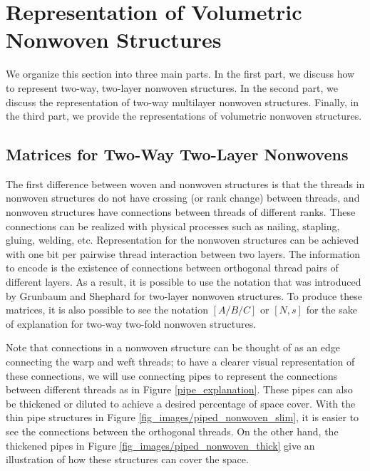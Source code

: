 \documentclass[times,twocolumn,final]{elsarticle}
\begin{document}
\section{Representation of Volumetric Nonwoven Structures}
\label{Sec_Representation_of_NWS}

We organize this section into three main parts. In the first part, we discuss how to represent two-way, two-layer nonwoven structures. In the second part, we discuss the representation of two-way multilayer nonwoven structures. Finally, in the third part, we provide the representations of volumetric nonwoven structures. 


\subsection{Matrices for Two-Way Two-Layer Nonwovens}

The first difference between woven and nonwoven structures is that the threads in nonwoven structures do not have crossing (or rank change) between threads, and nonwoven structures have connections between threads of different ranks. These connections can be realized with physical processes such as nailing, stapling, gluing, welding, etc. Representation for the nonwoven structures can be achieved with one bit per pairwise thread interaction between two layers. The information to encode is the existence of connections between orthogonal thread pairs of different layers. As a result, it is possible to use the notation that was introduced by Grunbaum and Shephard for two-layer nonwoven structures. To produce these matrices, it is also possible to see the notation $[A/B/C]$ or $[N,s]$ for the sake of explanation for two-way two-fold nonwoven structures.

Note that connections in a nonwoven structure can be thought of as an edge connecting the warp and weft threads; to have a clearer visual representation of these connections, we will use connecting pipes to represent the connections between different threads as in Figure \ref{pipe_explanation}. These pipes can also be thickened or diluted to achieve a desired percentage of space cover. With the thin pipe structures in Figure \ref{fig_images/piped_nonwoven_slim}, it is easier to see the connections between the orthogonal threads. On the other hand, the thickened pipes in Figure \ref{fig_images/piped_nonwoven_thick} give an illustration of how these structures can cover the space.
\end{document}

